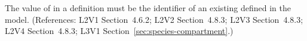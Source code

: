 The value of  in a \Species definition must be the
identifier of an existing \Compartment defined in the model.  (References:
L2V1 Section~4.6.2; L2V2 Section~4.8.3; L2V3 Section~4.8.3; L2V4 Section~4.8.3; 
L3V1 Section~\ref{sec:species-compartment}.)
